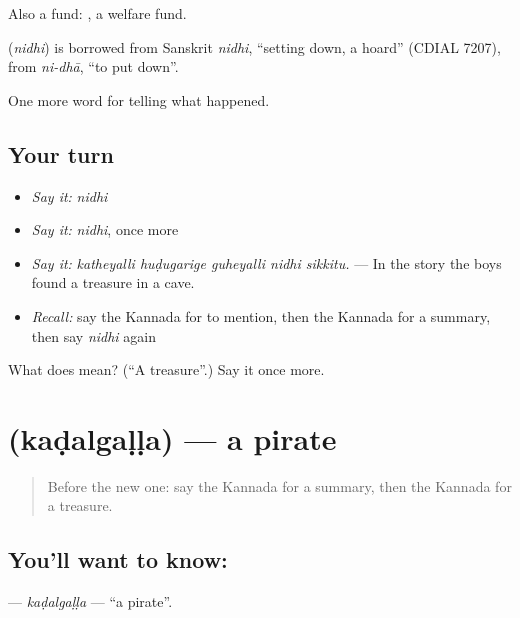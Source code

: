 Also a fund:  , a welfare fund.

\begin{cousinweb}
\textbf{} (\emph{nidhi}) is borrowed from Sanskrit \emph{nidhi}, \textquotedblleft{}setting down, a hoard\textquotedblright{} (CDIAL 7207), from \emph{ni-dhā}, \textquotedblleft{}to put down\textquotedblright{}.
\end{cousinweb}

\begin{grammarlens}[title={What you've built}]
One more word for telling what happened.
\end{grammarlens}

\subsection*{Your turn}
\begin{itemize}
\raggedright
  \item \emph{Say it:} \emph{nidhi}
  \item \emph{Say it:} \emph{nidhi}, once more
  \item \emph{Say it:} \emph{katheyalli huḍugarige guheyalli nidhi sikkitu.} — In the story the boys found a treasure in a cave.
  \item \emph{Recall:} say the Kannada for to mention, then the Kannada for a summary, then say \emph{nidhi} again
\end{itemize}

\begin{tcolorbox}[breakable,colback=teal!4,colframe=teal!35!black,title={Before you move on}]
What does  mean? (\textquotedblleft{}A treasure\textquotedblright{}.) Say it once more.
\end{tcolorbox}
\section[\texorpdfstring{\kn{ಕಡಲ್ಗಳ್ಳ} (kaḍalgaḷḷa)}{ಕಡಲ್ಗಳ್ಳ (kaḍalgaḷḷa)}]{ (kaḍalgaḷḷa) — a pirate}

\label{lesson:KA-C348-kadalgalla}



\begin{quote}
Before the new one: say the Kannada for a summary, then the Kannada for a treasure.
\end{quote}

\subsection*{You'll want to know: }
\textbf{} — \emph{kaḍalgaḷḷa} — \textquotedblleft{}a pirate\textquotedblright{}.

